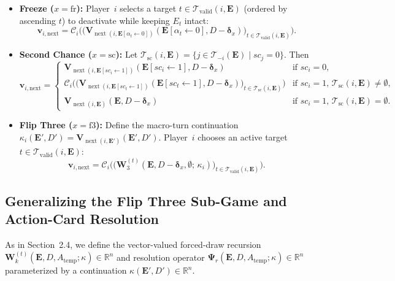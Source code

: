 \documentclass{article}
\theoremstyle{plain}
\theoremstyle{definition}
\theoremstyle{remark}
\DeclareMathOperator{\nextplayer}{next}
\begin{document}
\begin{itemize}
\begin{itemize}
        \item \textbf{Freeze ($x = \text{fr}$):} Player~$i$ selects a target $t \in \mathcal{T}_{\text{valid}}(i, \mathbf{E})$ (ordered by ascending $t$) to deactivate while keeping $E_t$ intact:
        \[
            \mathbf{v}_{i,\text{next}} = \mathcal{C}_i \Big( \big( \mathbf{V}_{\nextplayer(i, \mathbf{E}[\alpha_t \leftarrow 0])}(\mathbf{E}[\alpha_t \leftarrow 0], D - \boldsymbol{\delta}_x) \big)_{t \in \mathcal{T}_{\text{valid}}(i, \mathbf{E})} \Big).
        \]

        \item \textbf{Second Chance ($x = \text{sc}$):} Let $\mathcal{T}_{\text{sc}}(i, \mathbf{E}) = \{j \in \mathcal{T}_{-i}(\mathbf{E}) \mid sc_j = 0\}$. Then
        \[
            \mathbf{v}_{i,\text{next}} =
            \begin{cases}
                \mathbf{V}_{\nextplayer(i, \mathbf{E}[sc_i \leftarrow 1])}(\mathbf{E}[sc_i \leftarrow 1], D - \boldsymbol{\delta}_x) & \text{if } sc_i = 0, \\
                \mathcal{C}_i \Big( \big( \mathbf{V}_{\nextplayer(i, \mathbf{E}[sc_t \leftarrow 1])}(\mathbf{E}[sc_t \leftarrow 1], D - \boldsymbol{\delta}_x) \big)_{t \in \mathcal{T}_{\text{sc}}(i, \mathbf{E})} \Big) & \text{if } sc_i = 1,\, \mathcal{T}_{\text{sc}}(i, \mathbf{E}) \neq \emptyset, \\
                \mathbf{V}_{\nextplayer(i, \mathbf{E})}(\mathbf{E}, D - \boldsymbol{\delta}_x) & \text{if } sc_i = 1,\, \mathcal{T}_{\text{sc}}(i, \mathbf{E}) = \emptyset.
            \end{cases}
        \]

        \item \textbf{Flip Three ($x = \text{f3}$):} Define the macro-turn continuation $\kappa_i(\mathbf{E}', D') = \mathbf{V}_{\nextplayer(i, \mathbf{E}')}(\mathbf{E}', D')$. Player~$i$ chooses an active target $t \in \mathcal{T}_{\text{valid}}(i, \mathbf{E})$:
        \[
            \mathbf{v}_{i,\text{next}} = \mathcal{C}_i \Big( \big( \mathbf{W}_3^{(t)}(\mathbf{E}, D - \boldsymbol{\delta}_x, \emptyset; \, \kappa_i) \big)_{t \in \mathcal{T}_{\text{valid}}(i, \mathbf{E})} \Big).
        \]
    \end{itemize}
\end{itemize}

\subsection{Generalizing the Flip Three Sub-Game and Action-Card Resolution}
As in Section~2.4, we define the vector-valued forced-draw recursion $\mathbf{W}_k^{(t)}(\mathbf{E}, D, A_{\text{temp}}; \kappa) \in \mathbb{R}^n$ and resolution operator $\mathbf{\Psi}_r(\mathbf{E}, D, A_{\text{temp}}; \kappa) \in \mathbb{R}^n$ parameterized by a continuation $\kappa(\mathbf{E}', D') \in \mathbb{R}^n$.
\end{document}
